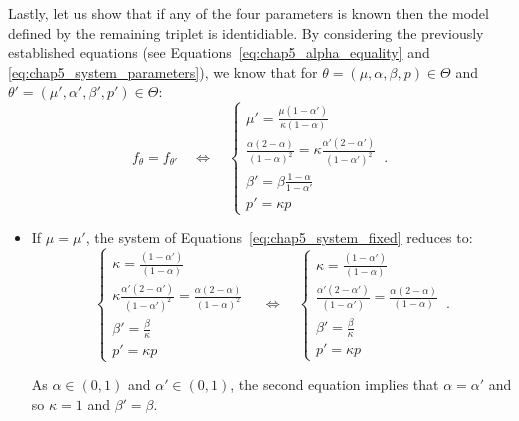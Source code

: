\begin{subappendices}
    Lastly, let us show that if any of the four parameters is known then the model defined by the remaining triplet is identidiable.
    By considering the previously established equations (see Equations~\eqref{eq:chap5_alpha_equality} and \eqref{eq:chap5_system_parameters}), 
    we know that for $\theta = (\mu, \alpha, \beta, p)\in\Theta$ and $\theta' = (\mu', \alpha', \beta', p')\in\Theta$:
    \begin{equation}\label{eq:chap5_system_fixed}
        f_{\theta} = f_{\theta'} \quad\iff\quad 
        \begin{cases*}
            \mu' = \frac{\mu(1-\alpha')}{\kappa(1-\alpha)}\\
            \frac{\alpha (2-\alpha)}{(1-\alpha)^2} = \kappa \frac{\alpha' (2-\alpha')}{(1-\alpha')^2}\\     
            \beta' = \beta \frac{1-\alpha}{1-\alpha'}\\
            p' = \kappa p
        \end{cases*}\,.
    \end{equation}
    \begin{itemize}
        \item If $\mu = \mu'$, the system of Equations~\eqref{eq:chap5_system_fixed} reduces to:
        \begin{equation*}
            \begin{cases*}
                \kappa = \frac{(1-\alpha')}{(1-\alpha)}\\
                \kappa \frac{\alpha' (2-\alpha')}{(1-\alpha')^2} = \frac{\alpha (2-\alpha)}{(1-\alpha)^2}\\     
                \beta' = \frac{\beta}{\kappa}\\
                p' = \kappa p
            \end{cases*}\quad\iff\quad
            \begin{cases*}
                \kappa = \frac{(1-\alpha')}{(1-\alpha)}\\
                \frac{\alpha' (2-\alpha')}{(1-\alpha')} = \frac{\alpha (2-\alpha)}{(1-\alpha)}\\     
                \beta' = \frac{\beta}{\kappa}\\
                p' = \kappa p
            \end{cases*}\,.
        \end{equation*}

        As $\alpha\in(0,1)$ and $\alpha'\in(0,1)$, the second equation implies that $\alpha=\alpha'$ and so $\kappa=1$ and $\beta'=\beta$.


\end{itemize}
\end{subappendices}
